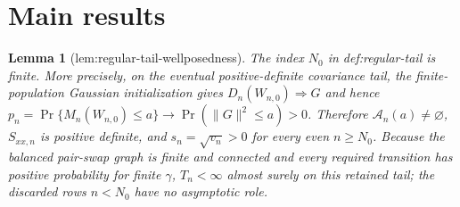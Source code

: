 \documentclass{article}
\newtheorem{lemma}{Lemma}
\begin{document}
\section{Main results}

\begin{lemma}[lem:regular-tail-wellposedness]\label{lem:regular-tail-wellposedness}
The index \(N_0\) in def:regular-tail is finite. More precisely, on the eventual positive-definite covariance tail, the finite-population Gaussian initialization gives \(D_n(W_{n,0})\Rightarrow G\) and hence \(p_n=\Pr\{M_n(W_{n,0})\le a\}\to\Pr(\|G\|^2\le a)>0\). Therefore \(\mathcal A_n(a)\neq\varnothing\), \(S_{xx,n}\) is positive definite, and \(s_n=\sqrt{v_n}>0\) for every even \(n\ge N_0\). Because the balanced pair-swap graph is finite and connected and every required transition has positive probability for finite \(\gamma\), \(T_n<\infty\) almost surely on this retained tail; the discarded rows \(n<N_0\) have no asymptotic role.
\end{lemma}
\end{document}

